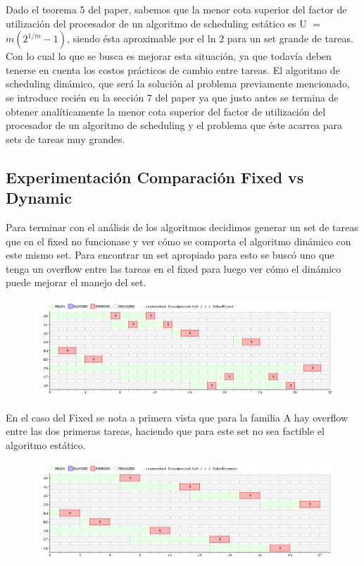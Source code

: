 Dado el teorema 5 del paper, sabemos que la menor cota superior del factor de utilización del procesador de un algoritmo de scheduling estático es U $=$ $m(2^{1/m}-1)$, siendo ésta aproximable por el ln 2 para un set grande de tareas. Con lo cual lo que se busca es mejorar esta situación, ya que todavía deben tenerse en cuenta los costos prácticos de cambio entre tareas. El algoritmo de scheduling dinámico, que será la solución al problema previamente mencionado, se introduce recién en la sección 7 del paper ya que justo antes se termina de obtener analíticamente la menor cota superior del factor de utilización del procesador de un algoritmo de scheduling y el problema que éste acarrea para sets de tareas muy grandes.


\subsection{Experimentación Comparación Fixed vs Dynamic}

Para terminar con el análisis de los algoritmos decidimos generar un set de tareas que en el fixed no funcionase y ver cómo se comporta el algoritmo dinámico con este mismo set.
Para encontrar un set apropiado para esto se buscó uno que tenga un overflow entre las tareas en el fixed para luego ver cómo el dinámico puede mejorar el manejo del set.

\begin{figure}[H]
  \centering
\includegraphics[scale=0.45]{fixedvsdynamic/fD.png}
  \caption[Algoritmo Fixed]{}
\end{figure}

En el caso del Fixed se nota a primera vista que para la familia A hay overflow entre las dos primeras tareas, haciendo que para este set no sea factible el algoritmo estático.

\begin{figure}[H]
  \centering
\includegraphics[scale=0.45]{fixedvsdynamic/fD2.png}
  \caption[Algoritmo Dinamico]{}
\end{figure}

